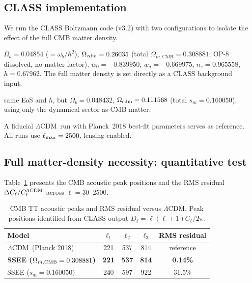 \documentclass[12pt,a4paper]{article}
\newcommand{\LCDM}{$\Lambda$CDM}
\newcommand{\sm}{s_m}
\newcommand{\OmmCMB}{\Omega_{m,\mathrm{CMB}}}
\begin{document}
\subsection{CLASS implementation}
\label{sec:class_setup}

We run the CLASS Boltzmann code \citep{Lesgourgues2011} (v3.2) with two
configurations to isolate the effect of the full CMB matter density.
\begin{description}[itemsep=1pt]
  \item[SSEE full-$\Omega_m$ ($\omega_m$-direct canonical):] $\Omega_b = 0.04854$
    ($=\omega_b/h^2$), $\Omega_{\rm cdm} = 0.26035$
    (total $\OmmCMB = 0.308881$; OP-8 dissolved, no matter factor), $w_0 = -0.839950$,
    $w_a = -0.669975$, $n_s = 0.965558$, $h = 0.67962$. The full matter density is
    set directly as a CLASS background input.
  \item[SSEE dynamical-only:] same EoS and $h$, but $\Omega_b = 0.048432$,
    $\Omega_{\rm cdm} = 0.111568$ (total $\sm = 0.160050$), using only the
    dynamical sector as CMB matter.
\end{description}
A fiducial \LCDM\ run with Planck~2018 best-fit parameters serves as reference.
All runs use $\ell_{\rm max} = 2500$, lensing enabled.

\subsection{Full matter-density necessity: quantitative test}
\label{sec:mira_test}

Table~\ref{tab:cmb_peaks} presents the CMB acoustic peak positions and the
RMS residual $\Delta C_\ell/C_\ell^{\Lambda\rm CDM}$ across $\ell = 30$--$2500$.

\begin{table}[htbp]
\centering
\caption{CMB TT acoustic peaks and RMS residual versus \LCDM.
         Peak positions identified from CLASS output $D_\ell = \ell(\ell+1)C_\ell/2\pi$.}
\label{tab:cmb_peaks}
\begin{tabular}{lcccc}
\toprule
Model & $\ell_1$ & $\ell_2$ & $\ell_3$ & RMS residual \\
\midrule
\LCDM\ (Planck 2018)    & 221 & 537 & 814 & reference \\
\textbf{SSEE ($\Omega_{m,\rm CMB}=0.308881$)}    & \textbf{221} & \textbf{537} & \textbf{814} & \textbf{0.14\%} \\
SSEE ($s_m=0.160050$)             & 240 & 597 & 922 & 31.5\% \\
\bottomrule
\end{tabular}
\end{table}
\end{document}
